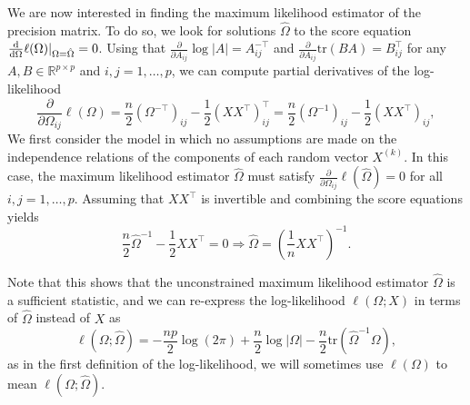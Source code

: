 We are now interested in finding the maximum likelihood estimator of the precision matrix. To do so, we look for solutions $\hat\Omega$ to the score equation $\frac{\text{d}}{\text{d}\Omega}\ell(\Omega)|_{\Omega=\hat\Omega} = 0$. Using that $\frac{\partial}{\partial A_{ij}} \log|A| = A_{ij}^{-\top}$ and $\frac{\partial}{\partial A_{ij}} \text{tr}(B A) = B_{ij}^\top$ for any $A, B \in \mathbb{R}^{p \times p}$ and $i, j = 1, \ldots, p$, we can compute partial derivatives of the log-likelihood
\begin{equation*}
    \frac{\partial}{\partial\Omega_{ij}}\ell(\Omega) 
    = \frac{n}{2}\left(\Omega^{-\top}\right)_{ij} - \frac{1}{2}\left(XX^\top\right)_{ij}^\top
    = \frac{n}{2}\left(\Omega^{-1}\right)_{ij} - \frac{1}{2}\left(XX^\top\right)_{ij},
\end{equation*}
We first consider the model in which no assumptions are made on the independence relations of the components of each random vector $X^{(k)}$. In this case, the maximum likelihood estimator $\hat\Omega$ must satisfy $\frac{\partial}{\partial\Omega_{ij}}\ell(\hat\Omega) = 0$ for all $i, j = 1, \ldots, p$. Assuming that $XX^\top$ is invertible and combining the score equations yields
\begin{equation*}
    \frac{n}{2}\hat\Omega^{-1} - \frac{1}{2}XX^\top = 0 \Rightarrow \hat\Omega = \left(\frac{1}{n}XX^\top\right)^{-1}.
\end{equation*}

Note that this shows that the unconstrained maximum likelihood estimator $\hat\Omega$ is a sufficient statistic, and we can re-express the log-likelihood $\ell(\Omega; X)$ in terms of $\hat\Omega$ instead of $X$ as
\begin{equation}\label{eq-ll-mle}
    \ell(\Omega; \hat\Omega) = -\frac{np}{2}\log(2\pi) + \frac{n}{2}\log |\Omega| - \frac{n}{2} \text{tr}\left(\hat\Omega^{-1}\Omega\right),
\end{equation}
as in the first definition of the log-likelihood, we will sometimes use $\ell(\Omega)$ to mean $\ell(\Omega; \hat\Omega)$.

